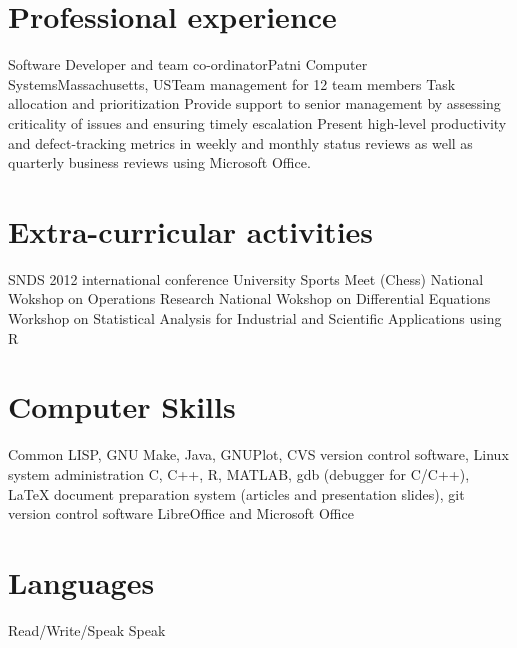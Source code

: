 \documentclass [a4paper,11pt]{moderncv}
\begin{document}
\section{Professional experience}
 {Software Developer and team co-ordinator}{Patni Computer Systems}{Massachusetts, US}{}{Team management for 12 team members \newline{} Task allocation and prioritization \newline{} Provide support to senior management by assessing criticality of issues and ensuring timely escalation \newline{} Present high-level productivity and defect-tracking metrics in weekly and monthly status reviews as well as quarterly business reviews using Microsoft Office.}


\section {Extra-curricular activities}
 {SNDS 2012 international conference}
 {University Sports Meet (Chess)}
 {National Wokshop on Operations Research}
 {National Wokshop on Differential Equations}
 {Workshop on Statistical Analysis for Industrial and Scientific Applications using R}

\section{Computer Skills}
 {Common LISP, GNU Make, Java, GNUPlot, CVS version control software,  Linux system administration}
 {C, C++, R, MATLAB, gdb (debugger for C/C++), \LaTeX \hspace{1pt} document preparation system (articles and presentation slides), git version control software}
 {LibreOffice and Microsoft Office}

\section{Languages}
 {Read/Write/Speak}
 {Speak}
\end{document}
